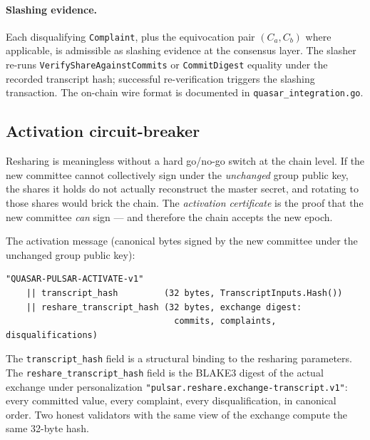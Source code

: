\paragraph{Slashing evidence.} Each disqualifying \texttt{Complaint}, plus the equivocation pair $(C_a, C_b)$ where applicable, is admissible as slashing evidence at the consensus layer. The slasher re-runs \texttt{VerifyShareAgainstCommits} or \texttt{CommitDigest} equality under the recorded transcript hash; successful re-verification triggers the slashing transaction. The on-chain wire format is documented in \texttt{quasar\_integration.go}.

\subsection{Activation circuit-breaker}
\label{sec:resharing-activation}

Resharing is meaningless without a hard go/no-go switch at the chain level. If the new committee cannot collectively sign under the \emph{unchanged} group public key, the shares it holds do not actually reconstruct the master secret, and rotating to those shares would brick the chain. The \emph{activation certificate} is the proof that the new committee \emph{can} sign --- and therefore the chain accepts the new epoch.

The activation message (canonical bytes signed by the new committee under the unchanged group public key):
\begin{verbatim}
"QUASAR-PULSAR-ACTIVATE-v1"
    || transcript_hash         (32 bytes, TranscriptInputs.Hash())
    || reshare_transcript_hash (32 bytes, exchange digest:
                                 commits, complaints, disqualifications)
\end{verbatim}
The \texttt{transcript\_hash} field is a structural binding to the resharing parameters. The \texttt{reshare\_transcript\_hash} field is the BLAKE3 digest of the actual exchange under personalization \texttt{"pulsar.reshare.exchange-transcript.v1"}: every committed value, every complaint, every disqualification, in canonical order. Two honest validators with the same view of the exchange compute the same 32-byte hash.

